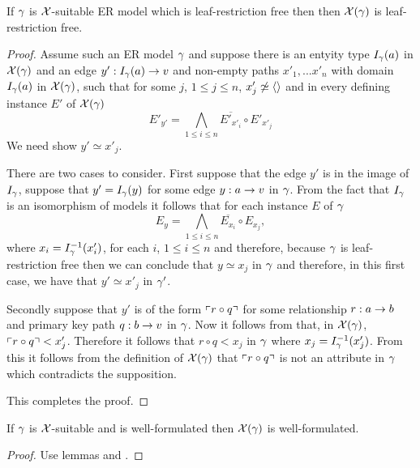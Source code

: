 \begin{lemma}
If $\gamma$ is $\mathcal{X}$-suitable ER model which is leaf-restriction free then
then $\mathcal{X}(\gamma)$ is leaf-restriction free.
\end{lemma}
\begin{proof}
Assume such an ER model $\gamma$ and suppose there is an entyity type $I_\gamma(a)$ in $\mathcal{X}(\gamma)$ and an edge $y': I_\gamma(a) \rightarrow v$ and non-empty paths $x'_1,...x'_n$   with domain $I_\gamma(a)$ in $\mathcal{X}(\gamma)$,  such that for some $j$, $1 \leq j \leq n$, $x'_j \not\simeq \langle\rangle$ and in every defining instance $E'$ of $\mathcal{X}(\gamma)$  
\begin{equation}
\label{restrictioninchimodel}
E'_{y'} = \bigwedge_{1 \leq i \leq n}{\overline{E'_{x'_i}}} \circ E'_{x'_j}
\end{equation}
We need show  $y' \simeq x'_j$.

There are two cases to consider. First suppose that the edge $y'$ is in the image of $I_\gamma$, suppose that $y'=I_\gamma(y)$ for some edge
$y:a \rightarrow v$ in $\gamma$. From the fact that $I_\gamma$ is an isomorphism of models it follows that for each instance $E$ of  $\gamma$
$$E_{y} = \bigwedge_{1 \leq i \leq n}{\overline{E_{x_i}}} \circ E_{x_j},$$
where $x_i=I^{-1}_\gamma(x'_i)$, for each $i$, $1 \leq i \leq n$ and therefore, because $\gamma$ is leaf-restriction free then we can conclude that
$y \simeq x_j$ in $\gamma$ and therefore, in this first case, we have that $y' \simeq x'_j$ in $\gamma'$.


Secondly suppose that $y'$ is of the form $\left\ulcorner r \circ q\right\urcorner$ for some relationship $r: a \rightarrow b$ and primary key path $q :b \rightarrow v$ in $\gamma$.
Now it follows from  that, in $\mathcal{X}(\gamma)$, $\left\ulcorner r \circ q\right\urcorner < x'_j$. Therefore  
it follows that $r \circ q < x_j$ in $\gamma$  where $x_j= I^{-1}_\gamma(x'_j)$. From this it follows from the definition of $\mathcal{X}(\gamma)$ that
 $\left\ulcorner r \circ q\right\urcorner$ is not an attribute in $\gamma$ which contradicts the supposition. 

This completes the proof.
\end{proof}

\begin{lemma}
If  $\gamma$ is $\mathcal{X}$-suitable and is well-formulated then  $\mathcal{X}(\gamma)$ is well-formulated. 
\end{lemma}
\begin{proof}
Use lemmas  and .
\end{proof}

